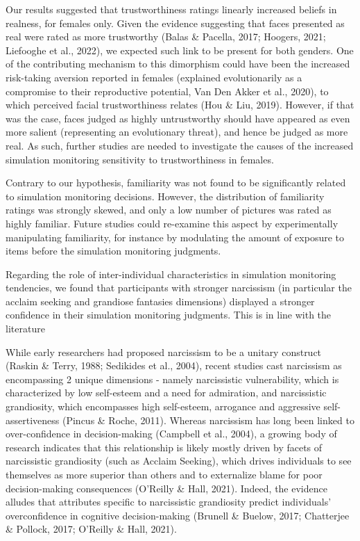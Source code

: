 \documentclass[
  man,floatsintext]{apa6}
\begin{document}
Our results suggested that trustworthiness ratings linearly increased beliefs in realness, for females only. Given the evidence suggesting that faces presented as real were rated as more trustworthy (Balas \& Pacella, 2017; Hoogers, 2021; Liefooghe et al., 2022), we expected such link to be present for both genders. One of the contributing mechanism to this dimorphism could have been the increased risk-taking aversion reported in females (explained evolutionarily as a compromise to their reproductive potential, Van Den Akker et al., 2020), to which perceived facial trustworthiness relates (Hou \& Liu, 2019). However, if that was the case, faces judged as highly untrustworthy should have appeared as even more salient (representing an evolutionary threat), and hence be judged as more real. As such, further studies are needed to investigate the causes of the increased simulation monitoring sensitivity to trustworthiness in females.

Contrary to our hypothesis, familiarity was not found to be significantly related to simulation monitoring decisions. However, the distribution of familiarity ratings was strongly skewed, and only a low number of pictures was rated as highly familiar. Future studies could re-examine this aspect by experimentally manipulating familiarity, for instance by modulating the amount of exposure to items before the simulation monitoring judgments.

Regarding the role of inter-individual characteristics in simulation monitoring tendencies, we found that participants with stronger narcissism (in particular the acclaim seeking and grandiose fantasies dimensions) displayed a stronger confidence in their simulation monitoring judgments. This is in line with the literature

While early researchers had proposed narcissism to be a unitary construct (Raskin \& Terry, 1988; Sedikides et al., 2004), recent studies cast narcissism as encompassing 2 unique dimensions - namely narcissistic vulnerability, which is characterized by low self-esteem and a need for admiration, and narcissistic grandiosity, which encompasses high self-esteem, arrogance and aggressive self-assertiveness (Pincus \& Roche, 2011). Whereas narcissism has long been linked to over-confidence in decision-making (Campbell et al., 2004), a growing body of research indicates that this relationship is likely mostly driven by facets of narcissistic grandiosity (such as Acclaim Seeking), which drives individuals to see themselves as more superior than others and to externalize blame for poor decision-making consequences (O'Reilly \& Hall, 2021). Indeed, the evidence alludes that attributes specific to narcissistic grandiosity predict individuals' overconfidence in cognitive decision-making (Brunell \& Buelow, 2017; Chatterjee \& Pollock, 2017; O'Reilly \& Hall, 2021).
\end{document}
